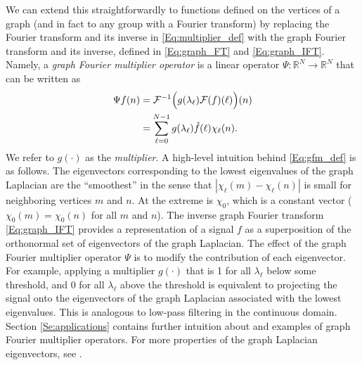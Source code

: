 \documentclass[conference]{IEEEtran}
\renewcommand{\l}{\ell}
\newcommand{\Rbb}{\mathbb{R}}
\begin{document}
We can extend this straightforwardly to functions defined on the vertices of a graph (and in fact to any group with a Fourier transform) by replacing the Fourier transform and its inverse in \eqref{Eq:multiplier_def} with the graph Fourier transform and its inverse, defined in \eqref{Eq:graph_FT} and \eqref{Eq:graph_IFT}. Namely, a \emph{graph Fourier multiplier operator} is a linear operator $\Psi: \Rbb^N \rightarrow \Rbb^{N}$ that can be written as
\begin{align}\label{Eq:gfm_def}
\Psi f(n) &= {\cal F}^{-1}\Bigl(g(\lambda_{\l}){\cal F}(f)(\l)\Bigr)(n) \nonumber \\
&= \sum\limits_{\l=0}^{N-1}g(\lambda_{\l}) \hat{f}(\l) \chi_{\l}(n).
\end{align}
We refer to $g(\cdot)$ as the \emph{multiplier}. A high-level intuition behind \eqref{Eq:gfm_def} is as follows. The eigenvectors corresponding to the lowest eigenvalues of the graph Laplacian are the ``smoothest'' in the sense that $\left|\chi_{\l}(m)-\chi_{\l}(n)\right|$ is small for neighboring vertices $m$ and $n$. At the extreme is $\chi_{0}$, which is a constant vector ($\chi_{0}(m)=\chi_{0}(n)$ for all $m$ and $n$). The inverse graph Fourier transform \eqref{Eq:graph_IFT} provides a representation of a signal $f$ as a superposition of the orthonormal set of eigenvectors of the graph Laplacian.
The effect of
the graph Fourier multiplier operator $\Psi$ is to modify
the contribution of each eigenvector. For example, applying a multiplier $g(\cdot)$ that is 1 for all $\lambda_{\l}$ below some threshold, and 0 for all $\lambda_{\l}$ above the threshold is equivalent to projecting the signal onto the eigenvectors of the graph Laplacian associated with the lowest eigenvalues. This is analogous to low-pass filtering in the continuous domain. Section \ref{Se:applications} contains further intuition about and examples of graph Fourier multiplier operators. For more properties of the graph Laplacian eigenvectors, see \cite{lap_eigen}.
\end{document}
